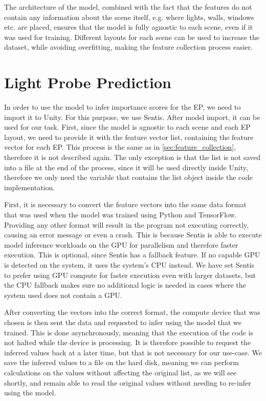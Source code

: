 The architecture of the model, combined with the fact that the features do not contain any information about the scene itself, e.g. where lights, walls, windows etc. are placed, ensures that the model is fully agnostic to each scene, even if it was used for training. Different layouts for each scene can be used to increase the dataset, while avoiding overfitting, making the feature collection process easier.

\section{Light Probe Prediction}
\label{sec:lp_predict}
In order to use the model to infer importance scores for the EP, we need to import it to Unity. For this purpose, we use Sentis. After model import, it can be used for our task. First, since the model is agnostic to each scene and each EP layout, we need to provide it with the feature vector list, containing the feature vector for each EP. This process is the same as in \ref{sec:feature_collection}, therefore it is not described again. The only exception is that the list is not saved into a file at the end of the process, since it will be used directly inside Unity, therefore we only need the variable that contains the list object inside the code implementation.

First, it is necessary to convert the feature vectors into the same data format that was used when the model was trained using Python and TensorFlow. Providing any other format will result in the program not executing correctly, causing an error message or even a crash. This is because Sentis is able to execute model inference workloads on the GPU for parallelism and therefore faster execution. This is optional, since Sentis has a fallback feature. If no capable GPU is detected on the system, it uses the system's CPU instead. We have set Sentis to prefer using GPU compute for faster execution even with larger datasets, but the CPU fallback makes sure no additional logic is needed in cases where the system used does not contain a GPU. 

After converting the vectors into the correct format, the compute device that was chosen is then sent the data and requested to infer using the model that we trained. This is done asynchronously, meaning that the execution of the code is not halted while the device is processing. It is therefore possible to request the inferred values back at a later time, but that is not necessary for our use-case. We save the inferred values to a file on the hard disk, meaning we can perform calculations on the values without affecting the original list, as we will see shortly, and remain able to read the original values without needing to re-infer using the model.\newline

